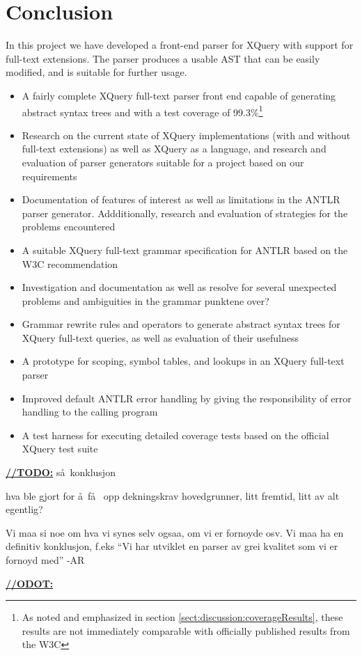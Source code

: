 \chapter{Conclusion}
\label{chapter:conclusion}



In this project we have developed a front-end parser for XQuery with support for full-text extensions. The parser produces a usable AST that can be easily modified, and is suitable for further usage.



\begin{itemize}
  \item A fairly complete XQuery full-text parser front end capable of
  generating abstract syntax trees and with a test coverage of
  99.3\%\footnote{As noted and emphasized in section
  \ref{sect:discussion:coverageResults},
  these results are not immediately comparable with officially published results
  from the W3C}
  \item Research on the current state of XQuery implementations (with and
  without full-text extensions) as well as XQuery as a language, and research and
  evaluation of parser generators suitable for a project based on our requirements
  \item Documentation of features of interest as well as limitations in the
  ANTLR parser generator. Addditionally, research and evaluation of
  strategies for the problems encountered
  \item A suitable XQuery full-text grammar specification for ANTLR based on the
  W3C recommendation
  \item Investigation and documentation as well as resolve for several unexpected
  problems and ambiguities in the grammar
  punktene over?
  \item Grammar rewrite rules and operators to generate abstract
  syntax trees for XQuery full-text queries, as well as evaluation of their
  usefulness
  \item A prototype for scoping, symbol tables, and lookups in an XQuery
  full-text parser
  \item Improved default ANTLR error handling by giving the responsibility
  of error handling to the calling program
  \item A test harness for executing detailed coverage tests based on the
  official XQuery test suite
\end{itemize}


\underline{\textbf{\LARGE //TODO:}}
s\aa~konklusjon


hva ble gjort for \aa ~f\aa~ opp dekningskrav hovedgrunner, litt fremtid, litt
av alt egentlig? 

Vi maa si noe om hva vi synes selv ogsaa, om vi er fornoyde osv. Vi maa ha en
definitiv konklusjon, f.eks ``Vi har utviklet en parser av grei kvalitet som vi
er fornoyd med'' 
-AR

\underline{\textbf{\LARGE //ODOT:}}